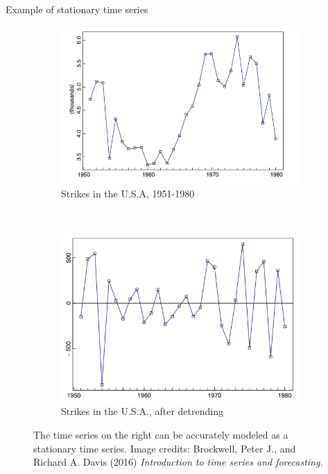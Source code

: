 \documentclass[10pt]{beamer}
\begin{document}
\begin{frame}{Example of stationary time series}
	
\begin{figure}[t!]
    \centering
    \begin{subfigure}[t]{0.48\textwidth}
        \centering
     \includegraphics[width=.95\textwidth]{images/strikes_in_USA.png}
        \caption{Strikes in the U.S.A, 1951-1980}
    \end{subfigure}%
    ~ 
    \begin{subfigure}[t]{0.48\textwidth}
        \centering
    \includegraphics[width=.95\textwidth]{images/strikes_in_USA_after_detrending.png}
        \caption{Strikes in the U.S.A., after detrending}
    \end{subfigure}
    \caption{The time series on the right can be accurately modeled as a stationary time series. Image credits: Brockwell, Peter J., and Richard A. Davis (2016) \textit{Introduction to time series and forecasting.}}
\end{figure}
\end{frame}
\end{document}
